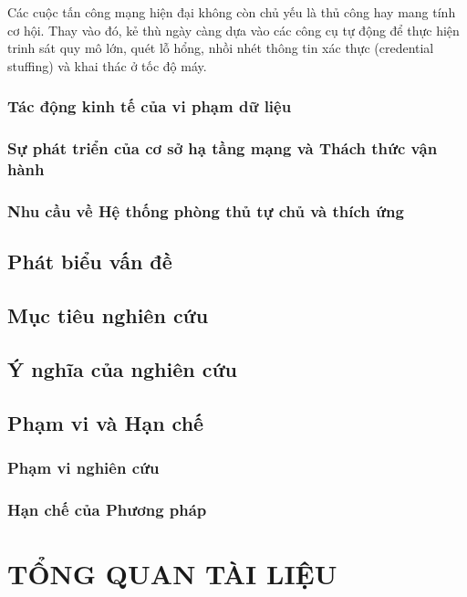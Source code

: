 \documentclass[12pt,a4paper,twoside]{report}
\begin{document}
Các cuộc tấn công mạng hiện đại không còn chủ yếu là thủ công hay mang tính cơ hội. Thay vào đó, kẻ thù ngày càng dựa vào các công cụ tự động để thực hiện trinh sát quy mô lớn, quét lỗ hổng, nhồi nhét thông tin xác thực (credential stuffing) và khai thác ở tốc độ máy.

\subsection{Tác động kinh tế của vi phạm dữ liệu}

\subsection{Sự phát triển của cơ sở hạ tầng mạng và Thách thức vận hành}

\subsection{Nhu cầu về Hệ thống phòng thủ tự chủ và thích ứng}

\section{Phát biểu vấn đề}

\section{Mục tiêu nghiên cứu}

\section{Ý nghĩa của nghiên cứu}

\section{Phạm vi và Hạn chế}

\subsection{Phạm vi nghiên cứu}

\subsection{Hạn chế của Phương pháp}

\chapter{TỔNG QUAN TÀI LIỆU}
\end{document}
